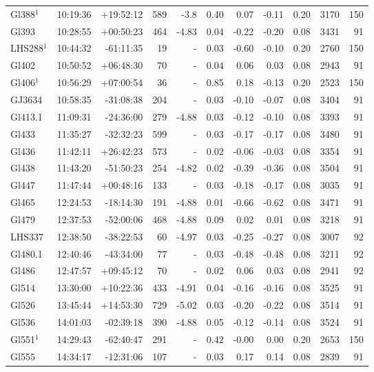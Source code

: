 \documentclass{aa}
\begin{document}
{\begin{longtable}{l r r r r r r r r r r}
Gl388$^1$ & 10:19:36 & +19:52:12 & 589 & -3.8 & 0.40 & 0.07 & -0.11 & 0.20 & 3170 &  150 \\
Gl393 & 10:28:55 & +00:50:23 & 464 & -4.83 & 0.04 & -0.22 & -0.20 & 0.08 & 3431 &   91 \\
LHS288$^1$ & 10:44:32 & -61:11:35 & 19 &    - & 0.03 & -0.60 & -0.10 & 0.20 & 2760 &  150 \\
Gl402 & 10:50:52 & +06:48:30 & 70 &    - & 0.04 & 0.06 & 0.03 & 0.08 & 2943 &   91 \\
Gl406$^1$ & 10:56:29 & +07:00:54 & 36 &    - & 0.85 & 0.18 & -0.13 & 0.20 & 2523 &  150 \\
GJ3634 & 10:58:35 & -31:08:38 & 204 &    - & 0.03 & -0.10 & -0.07 & 0.08 & 3404 &   91 \\
Gl413.1 & 11:09:31 & -24:36:00 & 279 & -4.88 & 0.03 & -0.12 & -0.10 & 0.08 & 3393 &   91 \\
Gl433 & 11:35:27 & -32:32:23 & 599 &    - & 0.03 & -0.17 & -0.17 & 0.08 & 3480 &   91 \\
Gl436 & 11:42:11 & +26:42:23 & 573 &    - & 0.02 & -0.06 & -0.03 & 0.08 & 3354 &   91 \\
Gl438 & 11:43:20 & -51:50:23 & 254 & -4.82 & 0.02 & -0.39 & -0.36 & 0.08 & 3504 &   91 \\
Gl447 & 11:47:44 & +00:48:16 & 133 &    - & 0.03 & -0.18 & -0.17 & 0.08 & 3035 &   91 \\
Gl465 & 12:24:53 & -18:14:30 & 191 & -4.88 & 0.01 & -0.66 & -0.62 & 0.08 & 3471 &   91 \\
Gl479 & 12:37:53 & -52:00:06 & 468 & -4.88 & 0.09 & 0.02 & 0.01 & 0.08 & 3218 &   91 \\
LHS337 & 12:38:50 & -38:22:53 & 60 & -4.97 & 0.03 & -0.25 & -0.27 & 0.08 & 3007 &   92 \\
Gl480.1 & 12:40:46 & -43:34:00 & 77 &    - & 0.03 & -0.48 & -0.48 & 0.08 & 3211 &   92 \\
Gl486 & 12:47:57 & +09:45:12 & 70 &    - & 0.02 & 0.06 & 0.03 & 0.08 & 2941 &   92 \\
Gl514 & 13:30:00 & +10:22:36 & 433 & -4.91 & 0.04 & -0.16 & -0.16 & 0.08 & 3525 &   91 \\
Gl526 & 13:45:44 & +14:53:30 & 729 & -5.02 & 0.03 & -0.20 & -0.22 & 0.08 & 3514 &   91 \\
Gl536 & 14:01:03 & -02:39:18 & 390 & -4.88 & 0.05 & -0.12 & -0.14 & 0.08 & 3524 &   91 \\
Gl551$^1$ & 14:29:43 & -62:40:47 & 291 &    - & 0.42 & -0.00 & 0.00 & 0.20 & 2653 &  150 \\
Gl555 & 14:34:17 & -12:31:06 & 107 &    - & 0.03 & 0.17 & 0.14 & 0.08 & 2839 &   91 \\

\end{longtable}}
\end{document}
